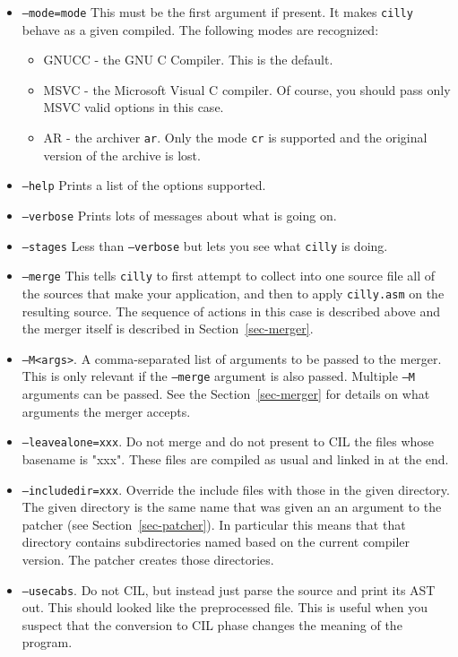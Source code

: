 \documentclass{article}
\def\secref#1{Section~\ref{sec-#1}}
\def\t#1{{\tt #1}}
\begin{document}
\begin{itemize}
\item \t{--mode=mode} This must be the first argument if present. It makes
\t{cilly} behave as a given compiled. The following modes are recognized: 
     \begin{itemize}
        \item GNUCC - the GNU C Compiler. This is the default.
        \item MSVC - the Microsoft Visual C compiler. Of course, you should
                     pass only MSVC valid options in this case. 
        \item AR - the archiver \t{ar}. Only the mode \t{cr} is supported and
                   the original version of the archive is lost. 
     \end{itemize}
\item \t{--help} Prints a list of the options supported.
\item \t{--verbose} Prints lots of messages about what is going on.
\item \t{--stages} Less than \t{--verbose} but lets you see what \t{cilly}
                   is doing. 
\item \t{--merge} This tells \t{cilly} to first attempt to collect into one
source file all of the sources that make your application, and then to apply
\t{cilly.asm} on the resulting source. The sequence of actions in this case is
described above and the merger itself is described in \secref{merger}.
\item \t{--M<args>}. A comma-separated list of arguments to be passed to the
merger. This is only relevant if the \t{--merge} argument is also passed.
Multiple \t{--M} arguments can be passed. See the \secref{merger} for details
on what arguments the merger accepts. 

\item \t{--leavealone=xxx}. Do not merge and do not present to CIL the files
whose basename is "xxx". These files are compiled as usual and linked in at
the end. 
\item \t{--includedir=xxx}. Override the include files with those in the given
directory. The given directory is the same name that was given an an argument
to the patcher (see \secref{patcher}). In particular this means that
that directory contains subdirectories named based on the current compiler
version. The patcher creates those directories. 
\item \t{--usecabs}. Do not CIL, but instead just parse the source and print
its AST out. This should looked like the preprocessed file. This is useful
when you suspect that the conversion to CIL phase changes the meaning of the
program. 
\end{itemize}
 
\end{document}
